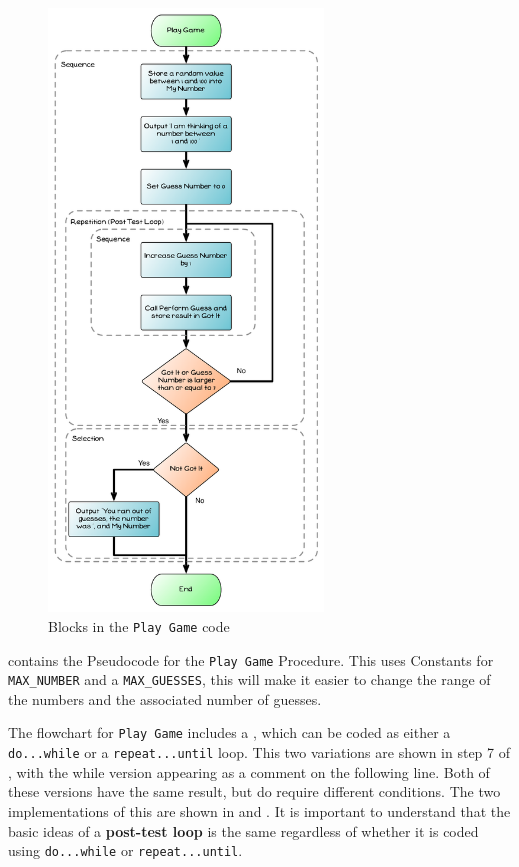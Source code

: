 \begin{figure}[htbp]
   \centering
   \includegraphics[width=0.65\textwidth]{./topics/control-flow/diagrams/PlayGame1} 
   \caption{Blocks in the \texttt{Play Game} code}
   \label{fig:play-game-diag1}
\end{figure}

\clearpage

 contains the Pseudocode for the \texttt{Play Game} Procedure. This uses Constants for \texttt{MAX\_NUMBER} and a \texttt{MAX\_GUESSES}, this will make it easier to change the range of the numbers and the associated number of guesses.

The flowchart for \texttt{Play Game} includes a , which can be coded as either a \texttt{do...while} or a \texttt{repeat...until} loop. This two variations are shown in step 7 of , with the while version appearing as a comment on the following line. Both of these versions have the same result, but do require different conditions. The two implementations of this are shown in  and . It is important to understand that the basic ideas of a \textbf{post-test loop} is the same regardless of whether it is coded using \texttt{do...while} or \texttt{repeat...until}.

